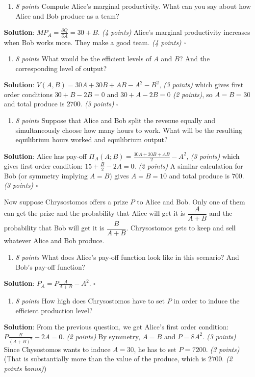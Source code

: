 \documentclass{article}
\begin{document}
\begin{enumerate}[label=(\alph*)]
\item \textit{8 points }Compute Alice's marginal productivity. What can you say about how Alice and Bob produce as a team? \end{enumerate}
\textbf{Solution}:
$MP_{A}=\frac{\partial Q}{\partial A}=30+B$. \textit{(4 points)} Alice's marginal productivity increases when Bob works more. They make a good team. \textit{(4 points)} $\square$

\begin{enumerate}[resume*]
\item \textit{8 points }What would be the efficient levels of $A$ and $B$? And the corresponding level of output?\end{enumerate}
\textbf{Solution}:
$V(A,B)=30A+30B+AB-A^{2}-B^{2}$, \textit{(3 points)} which gives first order conditions $30+B-2B=0$ and $30+A-2B=0$ \textit{(2 points)}, so $A=B=30$ and total produce is $2700$. \textit{(3 points)} $\square$

\begin{enumerate}[resume*]
\item \textit{8 points }Suppose that Alice and Bob split the revenue equally and simultaneously choose how many hours to work. What will be the resulting equilibrium hours worked and equilibrium output?\end{enumerate}
\textbf{Solution}:
Alice has pay-off $\Pi_{A}(A;B)=\frac{30A+30B+AB}2-A^{2}$, \textit{(3 points)} which gives first order condition: $15+\frac B2-2A=0$. \textit{(2 points)} A similar calculation for Bob (or symmetry implying $A=B$) gives $A=B=10$ and total produce is $700$. \textit{(3 points)} $\square$

Now suppose Chrysostomos offers a prize $P$ to Alice and Bob. Only one of them can get the prize and the probability that Alice will get it is $\dfrac{A}{A+B}$ and the probability that Bob will get it is $\dfrac B{A+B}$. Chrysostomos gets to keep and sell whatever Alice and Bob produce.

\begin{enumerate}[resume*]
  \item \textit{8 points }What does Alice's pay-off function look like in this scenario? And Bob's pay-off function?\end{enumerate}
  \textbf{Solution}:
  $P_{A}=P\frac A{A+B} -A^{2}$. $\square$

\begin{enumerate}[resume*]
  \item \textit{8 points }How high does Chrysostomos have to set $P$ in order to induce the efficient production level?\end{enumerate}
\textbf{Solution}:
From the previous question, we get Alice's first order condition: $P\frac B{(A+B)^{2}}-2A=0$. \textit{(2 points)} By symmetry, $A=B$ and $P=8A^{2}$. \textit{(3 points)} Since Chysostomos wants to induce $A=30$, he has to set $P=7200$. \textit{(3 points)} (That is substantially more than the value of the produce, which is $2700$. \textit{(2 points bonus)})
\end{document}

